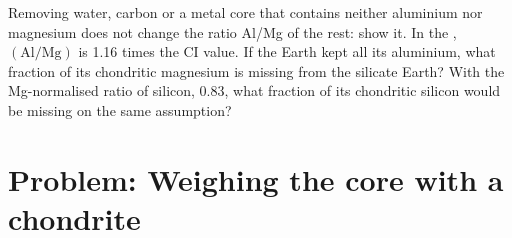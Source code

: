 \begin{exercise}[$\star\star\star$]\label{exo:b2:elements-in-the-earth:12}
Removing water, carbon or a metal core that contains neither aluminium nor
magnesium does not change the ratio Al/Mg of the rest: show it. In the , $(\mathrm{Al}/\mathrm{Mg})$ is 1.16 times the CI value. If the
Earth kept all its aluminium, what fraction of its chondritic magnesium is
missing from the silicate Earth? With the Mg-normalised ratio of silicon,
0.83, what fraction of its chondritic silicon would be missing on the same
assumption?
\end{exercise}

\section{Problem: Weighing the core with a chondrite}

